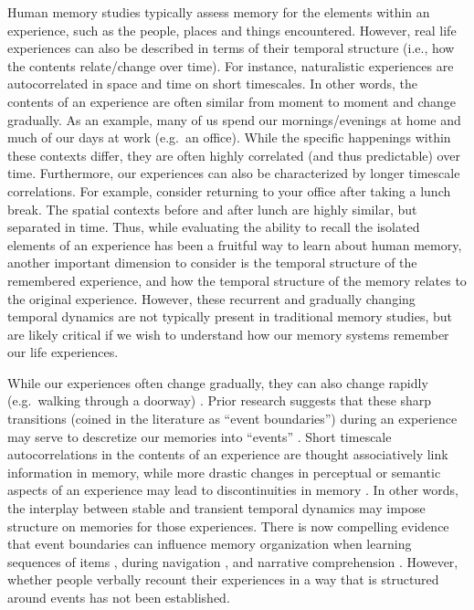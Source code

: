 \documentclass{article}
\begin{document}
Human memory studies typically assess memory for the elements within an experience, such as the people, places and things encountered. However, real life experiences can also be described in terms of their temporal structure (i.e., how the contents relate/change over time).  For instance, naturalistic experiences are autocorrelated in space and time on short timescales. In other words, the contents of an experience are often similar from moment to moment and change gradually. As an example, many of us spend our mornings/evenings at home and much of our days at work (e.g.\ an office). While the specific happenings within these contexts differ, they are often highly correlated (and thus predictable) over time. Furthermore, our experiences can also be characterized by longer timescale correlations. For example, consider returning to your office after taking a lunch break. The spatial contexts before and after lunch are highly similar, but separated in time. Thus, while evaluating the ability to recall the isolated elements of an experience has been a fruitful way to learn about human memory, another important dimension to consider is the temporal structure of the remembered experience, and how the temporal structure of the memory relates to the original experience. However, these recurrent and gradually changing temporal dynamics are not typically present in traditional memory studies, but are likely critical if we wish to understand how our memory systems remember our life experiences.

While our experiences often change gradually, they can also change rapidly (e.g.\ walking through a doorway) \citep{RadvZack17}. Prior research suggests that these sharp transitions (coined in the literature as ``event boundaries'') during an experience may serve to descretize our memories into ``events'' \citep{RadvZack17, BrunEtal18, HeusEtal18, ClewDava17, EzzyDava11, DuBrDava13}. Short timescale autocorrelations in the contents of an experience are thought associatively link information in memory, while more drastic changes in perceptual or semantic aspects of an experience may lead to discontinuities in memory \citep{HeusEtal18, BrunEtal18, EzzyDava11, DuBrDava13}.  In other words, the interplay between stable and transient temporal dynamics may impose structure on memories for those experiences. There is now compelling evidence that event boundaries can influence memory organization when learning sequences of items \citep{HeusEtal18, DuBrDava13}, during navigation \citep{BrunEtal18}, and narrative comprehension \citep{ZwaaRadv98, EzzyDava11}.  However, whether people verbally recount their experiences in a way that is structured around events has not been established.
\end{document}
